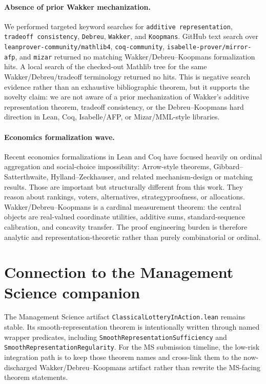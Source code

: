 \documentclass[11pt,english]{article}
\begin{document}
\paragraph{Absence of prior Wakker mechanization.}
We performed targeted keyword searches for \texttt{additive representation}, \texttt{tradeoff consistency}, \texttt{Debreu}, \texttt{Wakker}, and \texttt{Koopmans}.  GitHub text search over \texttt{leanprover-community/mathlib4}, \texttt{coq-community}, \texttt{isabelle-prover/mirror-afp}, and \texttt{mizar} returned no matching Wakker/Debreu--Koopmans formalization hits.  A local search of the checked-out Mathlib tree for the same Wakker/Debreu/tradeoff terminology returned no hits.  This is negative search evidence rather than an exhaustive bibliographic theorem, but it supports the novelty claim: we are not aware of a prior mechanization of Wakker's additive representation theorem, tradeoff consistency, or the Debreu--Koopmans hard direction in Lean, Coq, Isabelle/AFP, or Mizar/MML-style libraries.

\paragraph{Economics formalization wave.}
Recent economics formalizations in Lean and Coq have focused heavily on ordinal aggregation and social-choice impossibility: Arrow-style theorems, Gibbard--Satterthwaite, Hylland--Zeckhauser, and related mechanism-design or matching results.  Those are important but structurally different from this work.  They reason about rankings, voters, alternatives, strategyproofness, or allocations.  Wakker/Debreu--Koopmans is a cardinal measurement theorem: the central objects are real-valued coordinate utilities, additive sums, standard-sequence calibration, and concavity transfer.  The proof engineering burden is therefore analytic and representation-theoretic rather than purely combinatorial or ordinal.

\section{Connection to the Management Science companion}
\label{sec:ms}

The Management Science artifact \texttt{ClassicalLotteryInAction.lean} remains stable.  Its smooth-representation theorem is intentionally written through named wrapper predicates, including \texttt{SmoothRepresentationSufficiency} and \texttt{SmoothRepresentationRegularity}.  For the MS submission timeline, the low-risk integration path is to keep those theorem names and cross-link them to the now-discharged Wakker/Debreu--Koopmans artifact rather than rewrite the MS-facing theorem statements.
\end{document}
